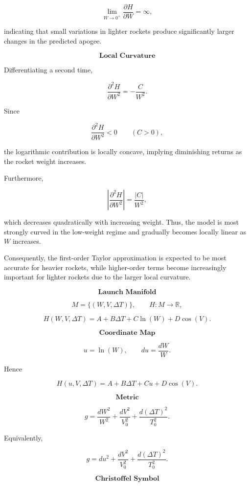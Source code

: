 \documentclass{article}
\begin{document}
\[
\lim_{W\to0^+}
\frac{\partial H}{\partial W}
=\infty,
\]

indicating that small variations in lighter rockets produce
significantly larger changes in the predicted apogee.

\vspace{0.5cm}

\[
\textbf{Local Curvature}
\]

Differentiating a second time,

\[
\frac{\partial^2H}{\partial W^2}
=
-\frac{C}{W^2}.
\]

Since

\[
\frac{\partial^2H}{\partial W^2}<0
\qquad (C>0),
\]

the logarithmic contribution is locally concave, implying diminishing
returns as the rocket weight increases.

Furthermore,

\[
\left|
\frac{\partial^2H}{\partial W^2}
\right|
=
\frac{|C|}{W^2},
\]

which decreases quadratically with increasing weight. Thus, the model
is most strongly curved in the low-weight regime and gradually becomes
locally linear as \(W\) increases.

\vspace{0.5cm}

Consequently, the first-order Taylor approximation is expected to be
most accurate for heavier rockets, while higher-order terms become
increasingly important for lighter rockets due to the larger local
curvature.

\[
\textbf{Launch Manifold}
\]

\[
M=\{(W,V,\Delta T)\}, \qquad
H:M\rightarrow\mathbb{R},
\]

\[
H(W,V,\Delta T)
=
A+B\Delta T+C\ln(W)+D\cos(V).
\]

\[
\textbf{Coordinate Map}
\]

\[
u=\ln(W),
\qquad
du=\frac{dW}{W}.
\]

Hence

\[
H(u,V,\Delta T)
=
A+B\Delta T+Cu+D\cos(V).
\]

\[
\textbf{Metric}
\]

\[
g
=
\frac{dW^2}{W^2}
+
\frac{dV^2}{V_0^2}
+
\frac{d(\Delta T)^2}{T_0^2}.
\]

Equivalently,

\[
g
=
du^2
+
\frac{dV^2}{V_0^2}
+
\frac{d(\Delta T)^2}{T_0^2}.
\]

\[
\textbf{Christoffel Symbol}
\]
\end{document}
